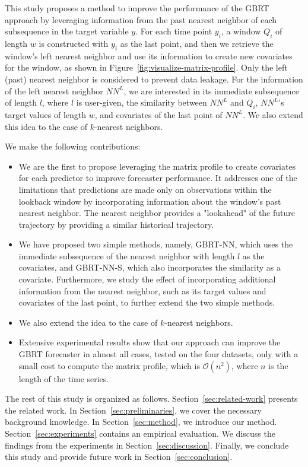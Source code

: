 
This study proposes a method to improve the performance of the GBRT approach by leveraging information from the past nearest neighbor of each subsequence in the target variable $y$.
For each time point $y_i$, a window $Q_i$ of length $w$ is constructed with $y_i$ as the last point, and then we retrieve the window's left nearest neighbor and use its information to create new covariates for the window, as shown in Figure~\ref{fig:visualize-matrix-profile}.
Only the left (past) nearest neighbor is considered to prevent data leakage.
For the information of the left nearest neighbor $NN^L$, we are interested in its immediate subsequence of length $l$, where $l$ is user-given, the similarity between $NN^L$ and $Q_i$, $NN^L$'s target values of length $w$, and covariates of the last point of $NN^L$.
We also extend this idea to the case of $k$-nearest neighbors.

We make the following contributions:
\begin{itemize}
  \item We are the first to propose leveraging the matrix profile to create covariates for each predictor to improve forecaster performance. 
  It addresses one of the limitations that predictions are made only on observations within the lookback window by incorporating information about the window's past nearest neighbor.
  The nearest neighbor provides a "lookahead" of the future trajectory by providing a similar historical trajectory. 
  \item We have proposed two simple methods, namely, \textsf{GBRT-NN}, which uses the immediate subsequence of the nearest neighbor with length $l$ as the covariates, and \textsf{GBRT-NN-S}, which also incorporates the similarity as a covariate.
  Furthermore, we study the effect of incorporating additional information from the nearest neighbor, such as its target values and covariates of the last point, to further extend the two simple methods. 
  \item We also extend the idea to the case of $k$-nearest neighbors.
  \item Extensive experimental results show that our approach can improve the GBRT forecaster in almost all cases, tested on the four datasets, only with a small cost to compute the matrix profile, which is $\mathcal{O}(n^2)$, where $n$ is the length of the time series.
\end{itemize}

The rest of this study is organized as follows.
Section~\ref{sec:related-work} presents the related work.
In Section~\ref{sec:preliminaries}, we cover the necessary background knowledge.
In Section~\ref{sec:method}, we introduce our method.
Section~\ref{sec:experiments} contains an empirical evaluation.
We discuss the findings from the experiments in Section~\ref{sec:discussion}.
Finally, we conclude this study and provide future work in Section~\ref{sec:conclusion}.